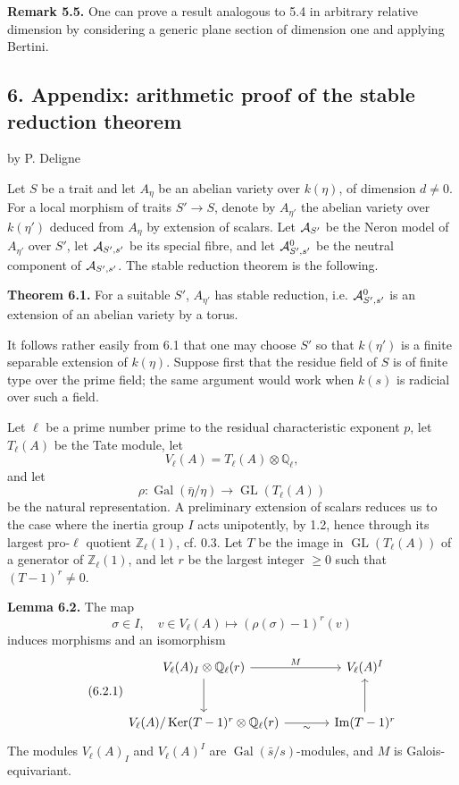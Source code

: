 \documentclass[11pt]{article}
\providecommand{\Gal}{\operatorname{Gal}}
\providecommand{\GL}{\operatorname{GL}}
\providecommand{\Ker}{\operatorname{Ker}}
\providecommand{\Ql}{\mathbb Q_\ell}
\providecommand{\Zl}{\mathbb Z_\ell}
\begin{document}
\textbf{Remark 5.5.} One can prove a result analogous to 5.4 in arbitrary relative dimension by considering a generic plane section of dimension one and applying Bertini.

\subsection*{6. Appendix: arithmetic proof of the stable reduction theorem}
\begin{center}
by P. Deligne
\end{center}
Let $S$ be a trait and let $A_\eta$ be an abelian variety over $k(\eta)$, of dimension $d\ne0$. For a local morphism of traits $S'\to S$, denote by $A_{\eta'}$ the abelian variety over $k(\eta')$ deduced from $A_\eta$ by extension of scalars. Let $\mathcal A_{S'}$ be the Neron model of $A_{\eta'}$ over $S'$, let $\mathcal A_{S',s'}$ be its special fibre, and let $\mathcal A^0_{S',s'}$ be the neutral component of $\mathcal A_{S',s'}$. The stable reduction theorem is the following.

\textbf{Theorem 6.1.} For a suitable $S'$, $A_{\eta'}$ has stable reduction, i.e. $\mathcal A^0_{S',s'}$ is an extension of an abelian variety by a torus.

It follows rather easily from 6.1 that one may choose $S'$ so that $k(\eta')$ is a finite separable extension of $k(\eta)$. Suppose first that the residue field of $S$ is of finite type over the prime field; the same argument would work when $k(s)$ is radicial over such a field.

Let $\ell$ be a prime number prime to the residual characteristic exponent $p$, let $T_\ell(A)$ be the Tate module, let
\[
 V_\ell(A)=T_\ell(A)\otimes\Ql,
\]
and let
\[
 \rho:\Gal(\bar\eta/\eta)\longrightarrow \GL(T_\ell(A))
\]
be the natural representation. A preliminary extension of scalars reduces us to the case where the inertia group $I$ acts unipotently, by 1.2, hence through its largest pro-$\ell$ quotient $\Zl(1)$, cf. 0.3. Let $T$ be the image in $\GL(T_\ell(A))$ of a generator of $\Zl(1)$, and let $r$ be the largest integer $\ge0$ such that $(T-1)^r\ne0$.

\textbf{Lemma 6.2.} The map
\[
 \sigma\in I,
 \quad v\in V_\ell(A)
 \longmapsto (\rho(\sigma)-1)^r(v)
\]
induces morphisms and an isomorphism
\begin{equation}\tag{6.2.1}
\begin{tikzcd}[column sep=large,row sep=large]
 V_\ell(A)_I\otimes\Ql(r) \arrow[r,"M"] \arrow[d]
 & V_\ell(A)^I \\
 V_\ell(A)/\Ker(T-1)^r\otimes\Ql(r) \arrow[r,"\sim"']
 & \Ima(T-1)^r \arrow[u]
\end{tikzcd}
\end{equation}
The modules $V_\ell(A)_I$ and $V_\ell(A)^I$ are $\Gal(\bar s/s)$-modules, and $M$ is Galois-equivariant.
\end{document}
